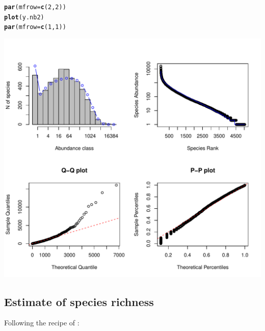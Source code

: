 \documentclass[12pt, A4]{article}\usepackage[]{graphicx}\usepackage[]{color}
\makeatletter
\def\maxwidth{ %
  \ifdim\Gin@nat@width>\linewidth
    \linewidth
  \else
    \Gin@nat@width
  \fi
}
\newcommand{\hlnum}[1]{\textcolor[rgb]{0.686,0.059,0.569}{#1}}%
\newcommand{\hlstd}[1]{\textcolor[rgb]{0.345,0.345,0.345}{#1}}%
\newcommand{\hlkwc}[1]{\textcolor[rgb]{0.333,0.667,0.333}{#1}}%
\newcommand{\hlkwd}[1]{\textcolor[rgb]{0.737,0.353,0.396}{\textbf{#1}}}%
\newenvironment{kframe}{%
 \def\at@end@of@kframe{}%
 \ifinner\ifhmode%
  \def\at@end@of@kframe{\end{minipage}}%
  \begin{minipage}{\columnwidth}%
 \fi\fi%
 \def\FrameCommand##1{\hskip\@totalleftmargin \hskip-\fboxsep
 \colorbox{shadecolor}{##1}\hskip-\fboxsep
     \hskip-\linewidth \hskip-\@totalleftmargin \hskip\columnwidth}%
 \MakeFramed {\advance\hsize-\width
   \@totalleftmargin\z@ \linewidth\hsize
   \@setminipage}}%
 {\par\unskip\endMakeFramed%
 \at@end@of@kframe}
\newenvironment{knitrout}{}{} %
\makeatother
\begin{document}
\begin{knitrout}
\color{fgcolor}\begin{kframe}
\begin{alltt}
\hlkwd{par}\hlstd{(}\hlkwc{mfrow}\hlstd{=}\hlkwd{c}\hlstd{(}\hlnum{2}\hlstd{,}\hlnum{2}\hlstd{))}
\hlkwd{plot}\hlstd{(y.nb2)}
\hlkwd{par}\hlstd{(}\hlkwc{mfrow}\hlstd{=}\hlkwd{c}\hlstd{(}\hlnum{1}\hlstd{,}\hlnum{1}\hlstd{))}
\end{alltt}
\end{kframe}

{\centering \includegraphics[width=\maxwidth]{figure/nb_plots-1} 

}



\end{knitrout}


\subsection*{Estimate of  species richness}

Following the recipe of \citet{tovo2017}:
\end{document}
